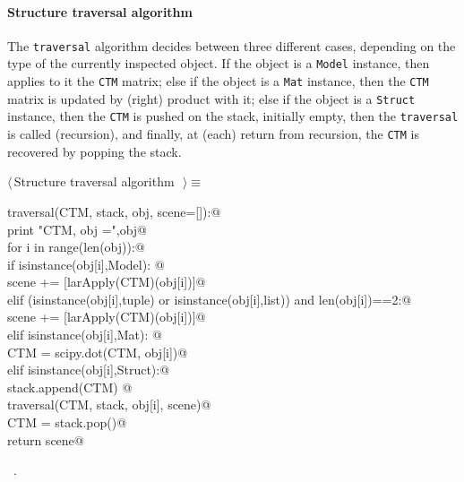 \documentclass[11pt,oneside]{article}	%
\begin{document}
\paragraph{Structure traversal algorithm}

The \texttt{traversal} algorithm decides between three different cases, depending on the type of the currently inspected object. If the object is a \texttt{Model} instance, then applies to it the \texttt{CTM} matrix; else if the object is a \texttt{Mat} instance, then the \texttt{CTM} matrix is updated by (right) product with it; else if the object is a \texttt{Struct} instance, then the \texttt{CTM} is pushed on the stack, initially empty, then the \texttt{traversal} is called (recursion), and finally, at (each) return from recursion, the \texttt{CTM} is recovered by popping the stack.

\begin{flushleft} \small \label{scrap37}
$\langle\,$Structure traversal algorithm\nobreak\ {\footnotesize {}}$\,\rangle\equiv$
\vspace{-1ex}
\begin{list}{}{} \item
\mbox{}\verb@def traversal(CTM, stack, obj, scene=[]):@\\
\mbox{}\verb@   print "\n CTM, obj =",obj@\\
\mbox{}\verb@   for i in range(len(obj)):@\\
\mbox{}\verb@      if isinstance(obj[i],Model): @\\
\mbox{}\verb@         scene += [larApply(CTM)(obj[i])]@\\
\mbox{}\verb@      elif (isinstance(obj[i],tuple) or isinstance(obj[i],list)) and len(obj[i])==2:@\\
\mbox{}\verb@         scene += [larApply(CTM)(obj[i])]@\\
\mbox{}\verb@      elif isinstance(obj[i],Mat): @\\
\mbox{}\verb@         CTM = scipy.dot(CTM, obj[i])@\\
\mbox{}\verb@      elif isinstance(obj[i],Struct):@\\
\mbox{}\verb@         stack.append(CTM) @\\
\mbox{}\verb@         traversal(CTM, stack, obj[i], scene)@\\
\mbox{}\verb@         CTM = stack.pop()@\\
\mbox{}\verb@   return scene@\\
\mbox{}\verb@@{\NWsep}
\end{list}
\vspace{-1ex}
\footnotesize\addtolength{\baselineskip}{-1ex}
\begin{list}{}{\setlength{\itemsep}{-\parsep}\setlength{\itemindent}{-\leftmargin}}
\item \NWtxtMacroRefIn\ .
\end{list}
\end{flushleft}
\end{document}
